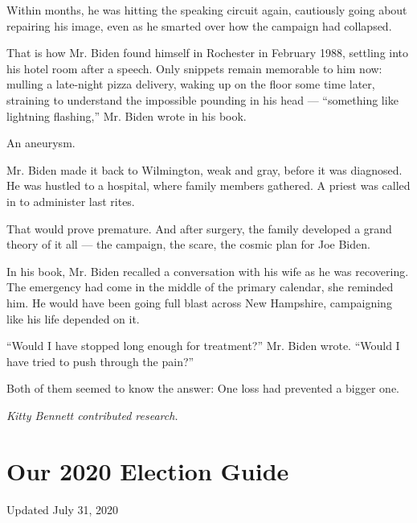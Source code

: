 Within months, he was hitting the speaking circuit again, cautiously
going about repairing his image, even as he smarted over how the
campaign had collapsed.

That is how Mr. Biden found himself in Rochester in February 1988,
settling into his hotel room after a speech. Only snippets remain
memorable to him now: mulling a late-night pizza delivery, waking up on
the floor some time later, straining to understand the impossible
pounding in his head --- ``something like lightning flashing,'' Mr.
Biden wrote in his book.

An aneurysm.

Mr. Biden made it back to Wilmington, weak and gray, before it was
diagnosed. He was hustled to a hospital, where family members gathered.
A priest was called in to administer last rites.

That would prove premature. And after surgery, the family developed a
grand theory of it all --- the campaign, the scare, the cosmic plan for
Joe Biden.

In his book, Mr. Biden recalled a conversation with his wife as he was
recovering. The emergency had come in the middle of the primary
calendar, she reminded him. He would have been going full blast across
New Hampshire, campaigning like his life depended on it.

``Would I have stopped long enough for treatment?'' Mr. Biden wrote.
``Would I have tried to push through the pain?''

Both of them seemed to know the answer: One loss had prevented a bigger
one.

\emph{Kitty Bennett contributed research.}

\hypertarget{our-2020-election-guide}{%
\section{Our 2020 Election Guide}\label{our-2020-election-guide}}

Updated July 31, 2020

